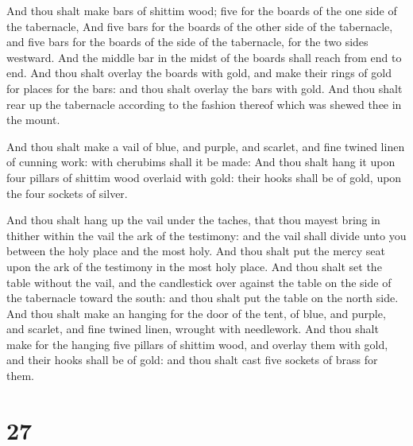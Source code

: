 And thou shalt make bars of shittim wood; five for the
boards of the one side of the tabernacle,  And five bars
for the boards of the other side of the tabernacle, and five bars for
the boards of the side of the tabernacle, for the two sides westward.
 And the middle bar in the midst of the boards shall
reach from end to end.  And thou shalt overlay the boards
with gold, and make their rings of gold for places for the bars: and
thou shalt overlay the bars with gold.  And thou shalt
rear up the tabernacle according to the fashion thereof which was shewed
thee in the mount.

 And thou shalt make a vail of blue, and purple, and
scarlet, and fine twined linen of cunning work: with cherubims shall it
be made:  And thou shalt hang it upon four pillars of
shittim wood overlaid with gold: their hooks shall be of gold, upon the
four sockets of silver.

 And thou shalt hang up the vail under the taches, that
thou mayest bring in thither within the vail the ark of the testimony:
and the vail shall divide unto you between the holy place and the most
holy.  And thou shalt put the mercy seat upon the ark of
the testimony in the most holy place.  And thou shalt set
the table without the vail, and the candlestick over against the table
on the side of the tabernacle toward the south: and thou shalt put the
table on the north side.  And thou shalt make an hanging
for the door of the tent, of blue, and purple, and scarlet, and fine
twined linen, wrought with needlework.  And thou shalt
make for the hanging five pillars of shittim wood, and overlay them with
gold, and their hooks shall be of gold: and thou shalt cast five sockets
of brass for them.

\hypertarget{section-26}{%
\section{27}\label{section-26}}

